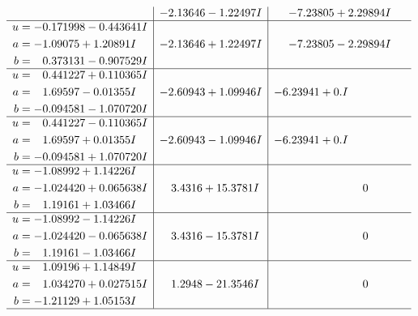 \documentclass[1p]{elsarticle_modified}
\theoremstyle{definition}
\begin{document}
$$\begin{array}{c|c|c}
 & -2.13646 - 1.22497 I & -7.23805 + 2.29894 I \\ \hline\begin{aligned}
u &= -0.171998 - 0.443641 I \\
a &= -1.09075 + 1.20891 I \\
b &= \phantom{-}0.373131 - 0.907529 I\end{aligned}
 & -2.13646 + 1.22497 I & -7.23805 - 2.29894 I \\ \hline\begin{aligned}
u &= \phantom{-}0.441227 + 0.110365 I \\
a &= \phantom{-}1.69597 - 0.01355 I \\
b &= -0.094581 - 1.070720 I\end{aligned}
 & -2.60943 + 1.09946 I & -6.23941 + 0. I\phantom{ +0.000000I} \\ \hline\begin{aligned}
u &= \phantom{-}0.441227 - 0.110365 I \\
a &= \phantom{-}1.69597 + 0.01355 I \\
b &= -0.094581 + 1.070720 I\end{aligned}
 & -2.60943 - 1.09946 I & -6.23941 + 0. I\phantom{ +0.000000I} \\ \hline\begin{aligned}
u &= -1.08992 + 1.14226 I \\
a &= -1.024420 + 0.065638 I \\
b &= \phantom{-}1.19161 + 1.03466 I\end{aligned}
 & \phantom{-}3.4316 + 15.3781 I & \phantom{-0.000000 } 0 \\ \hline\begin{aligned}
u &= -1.08992 - 1.14226 I \\
a &= -1.024420 - 0.065638 I \\
b &= \phantom{-}1.19161 - 1.03466 I\end{aligned}
 & \phantom{-}3.4316 - 15.3781 I & \phantom{-0.000000 } 0 \\ \hline\begin{aligned}
u &= \phantom{-}1.09196 + 1.14849 I \\
a &= \phantom{-}1.034270 + 0.027515 I \\
b &= -1.21129 + 1.05153 I\end{aligned}
 & \phantom{-}1.2948 - 21.3546 I & \phantom{-0.000000 } 0\\
 \hline 
 \end{array}$$\newpage$$\begin{array}{c|c|c}  

\end{array}$$
\end{document}
